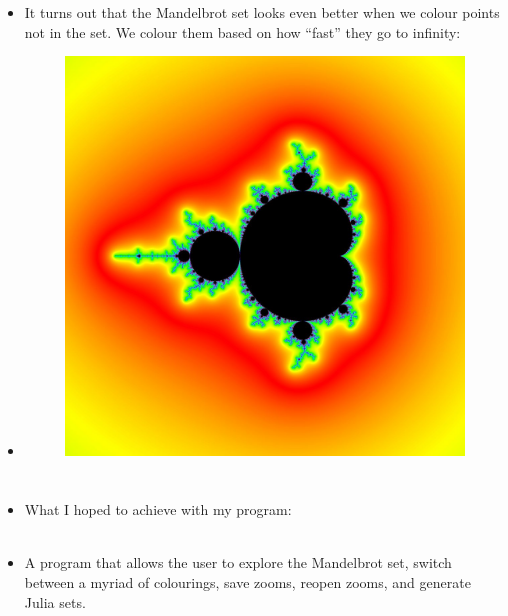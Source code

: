 \documentclass{beamer}
\begin{document}
\frame
{
\begin{itemize}
\item <1->It turns out that the Mandelbrot set looks even better when we colour points not in the set. We colour them based on how ``fast'' they go to infinity:
\item <2-> \begin{figure}
\centering
\includegraphics[scale=0.15]{presentation_images/mandelbrot_coloured.jpg} %
\end{figure}
\end{itemize}
}

\section{}
\frame
{
\begin{itemize}
\item <1-> What I hoped to achieve with my program:\\\text{}\\
\item <2-> A program that allows the user to explore the Mandelbrot set, switch between a myriad of colourings, save zooms, reopen zooms, and generate Julia sets.
\end{itemize}
}
\end{document}
